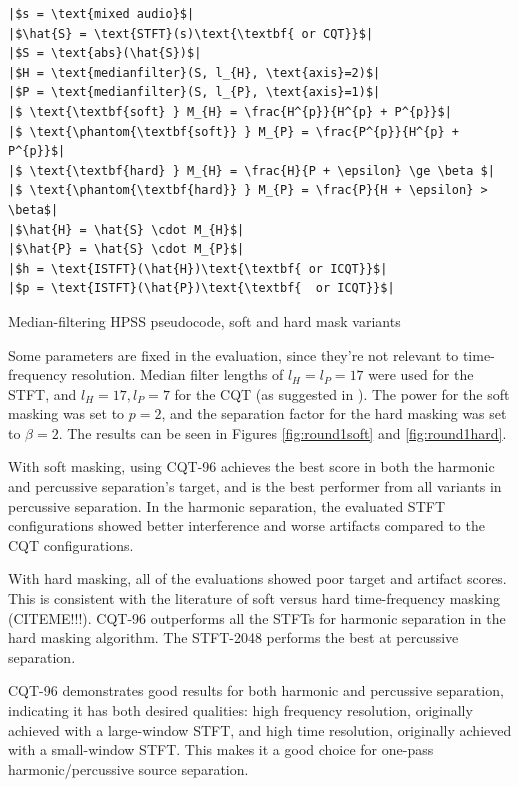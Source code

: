 \documentclass[10pt,letter]{article}
\newlength{\mintednumbersep}
\begin{document}
\begin{listing}[h]
\setlength\partopsep{-\topsep}
\begin{verbatim}
|$s = \text{mixed audio}$|
|$\hat{S} = \text{STFT}(s)\text{\textbf{ or CQT}}$|
|$S = \text{abs}(\hat{S})$|
|$H = \text{medianfilter}(S, l_{H}, \text{axis}=2)$|
|$P = \text{medianfilter}(S, l_{P}, \text{axis}=1)$|
|$ \text{\textbf{soft} } M_{H} = \frac{H^{p}}{H^{p} + P^{p}}$|
|$ \text{\phantom{\textbf{soft}} } M_{P} = \frac{P^{p}}{H^{p} + P^{p}}$|
|$ \text{\textbf{hard} } M_{H} = \frac{H}{P + \epsilon} \ge \beta $|
|$ \text{\phantom{\textbf{hard}} } M_{P} = \frac{P}{H + \epsilon} > \beta$|
|$\hat{H} = \hat{S} \cdot M_{H}$|
|$\hat{P} = \hat{S} \cdot M_{P}$|
|$h = \text{ISTFT}(\hat{H})\text{\textbf{ or ICQT}}$|
|$p = \text{ISTFT}(\hat{P})\text{\textbf{  or ICQT}}$|
\end{verbatim}
\caption{Median-filtering HPSS pseudocode, soft and hard mask variants}
\label{code:onepasspseudo}
\end{listing}

Some parameters are fixed in the evaluation, since they're not relevant to time-frequency resolution. Median filter lengths of $l_{H} = l_{P} = 17$ were used for the STFT, and $l_{H} = 17, l_{P} = 7$ for the CQT (as suggested in \cite{fitzgerald2}). The power for the soft masking was set to $p = 2$, and the separation factor for the hard masking was set to $\beta = 2$. The results can be seen in Figures \ref{fig:round1soft} and \ref{fig:round1hard}.

With soft masking, using CQT-96 achieves the best score in both the harmonic and percussive separation's target, and is the best performer from all variants in percussive separation. In the harmonic separation, the evaluated STFT configurations showed better interference and worse artifacts compared to the CQT configurations.

With hard masking, all of the evaluations showed poor target and artifact scores. This is consistent with the literature of soft versus hard time-frequency masking (CITEME!!!). CQT-96 outperforms all the STFTs for harmonic separation in the hard masking algorithm. The STFT-2048 performs the best at percussive separation.

CQT-96 demonstrates good results for both harmonic and percussive separation, indicating it has both desired qualities: high frequency resolution, originally achieved with a large-window STFT, and high time resolution, originally achieved with a small-window STFT. This makes it a good choice for one-pass harmonic/percussive source separation.
\end{document}
